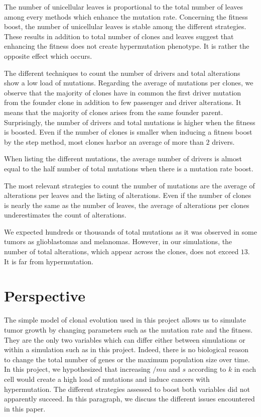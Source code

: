 \documentclass[a4paper]{article}
\begin{document}
\begin{multicols}{2}
The number of unicellular leaves is proportional to the total number of leaves among every methods which enhance the mutation rate. Concerning the fitness boost, the number of unicellular leaves is stable among the different strategies. These results in addition to total number of clones and leaves suggest that enhancing the fitness does not create hypermutation phenotype. It is rather the opposite effect which occurs. 




The different techniques to count the number of drivers and total alterations show a low load of mutations. Regarding the average of mutations per clones, we observe that the majority of clones have in common the first driver mutation from the founder clone in addition to few passenger and driver alterations. It means that the majority of clones arises from the same founder parent. Surprisingly, the number of drivers and total mutations is higher when the fitness is boosted. Even if the number of clones is smaller when inducing a fitness boost by the step method, most clones harbor an average of more than $2$ drivers. 

When listing the different mutations, the average number of drivers is almost equal to the half number of total mutations when there is a mutation rate boost. 


The most relevant strategies to count the number of mutations are the average of alterations per leaves and the listing of alterations. Even if the number of clones is nearly the same as the number of leaves, the average of alterations per clones underestimates the count of alterations.








We expected hundreds or thousands of total mutations as it was observed in some tumors as glioblastomas and melanomas. However, in our simulations, the number of total alterations, which appear across the clones, does not exceed $13$. It is far from hypermutation. 




\section{Perspective}

The simple model of clonal evolution used in this project allows us to simulate tumor growth by changing parameters such as the mutation rate and the fitness. They are the only two variables which can differ either between simulations or within a simulation such as in this project. Indeed, there is no biological reason to change the total number of genes or the maximum population size over time. In this project, we hypothesized that increasing $/mu$ and $s$ according to $k$ in each cell would create a high load of mutations and induce cancers with hypermutation. The different strategies assessed to boost both variables did not apparently succeed. In this paragraph, we discuss the different issues encountered in this paper. 


\end{multicols}
\end{document}
